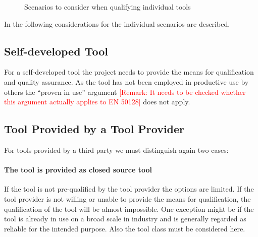 \begin{figure}
\begin{center}
\end{center}
\caption{Scenarios to consider when qualifying individual tools}
\label{fig:tool-qualification-scenarios}
\end{figure}

In the following considerations for the individual scenarios are described.

\subsection{Self-developed Tool}

For a self-developed tool the project needs to provide the means for qualification and quality assurance. As the tool has not been employed in productive use by others the ``proven in use'' argument \textcolor{red}{[Remark: It needs to be checked whether this argument actually applies to EN 50128]} does not apply.

\subsection{Tool Provided by a Tool Provider}

For tools provided by a third party we must distinguish again two cases:

\paragraph{The tool is provided as closed source tool}

If the tool is not pre-qualified by the tool provider the options are limited. If the tool provider is not willing or unable to provide the means for qualification, the qualification of the tool will be almost impossible. One exception might be if the tool is already in use on a broad scale in industry and is generally regarded as reliable for the intended purpose. Also the tool class must be considered here.


